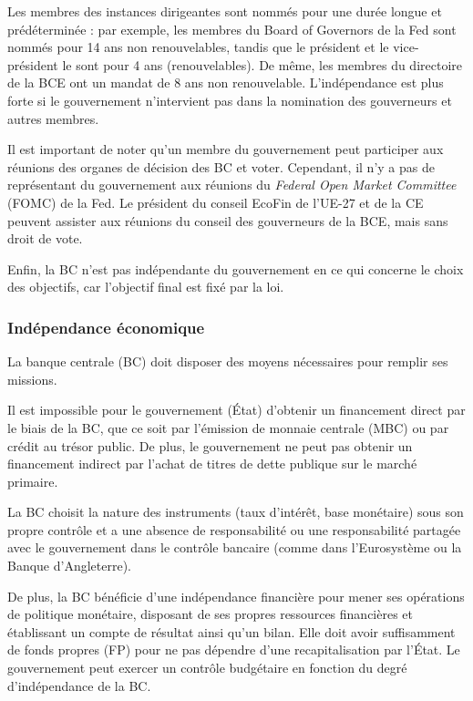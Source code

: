 \documentclass[a4paper, 12pt]{report}
\begin{document}
Les membres des instances dirigeantes sont nommés pour une durée longue et prédéterminée : par exemple, les membres du Board of Governors de la Fed sont nommés pour 14 ans non renouvelables, tandis que le président et le vice-président le sont pour 4 ans (renouvelables). De même, les membres du directoire de la BCE ont un mandat de 8 ans non renouvelable. L'indépendance est plus forte si le gouvernement n'intervient pas dans la nomination des gouverneurs et autres membres. 

Il est important de noter qu'un membre du gouvernement peut participer aux réunions des organes de décision des BC et voter. Cependant, il n'y a pas de représentant du gouvernement aux réunions du \textit{Federal Open Market Committee} (FOMC) de la Fed. Le président du conseil EcoFin de l'UE-27 et de la CE peuvent assister aux réunions du conseil des gouverneurs de la BCE, mais sans droit de vote. 

Enfin, la BC n'est pas indépendante du gouvernement en ce qui concerne le choix des objectifs, car l'objectif final est fixé par la loi.

\subsubsection{Indépendance économique}

La banque centrale (BC) doit disposer des moyens nécessaires pour remplir ses missions. 

Il est impossible pour le gouvernement (État) d'obtenir un financement direct par le biais de la BC, que ce soit par l'émission de monnaie centrale (MBC) ou par crédit au trésor public. De plus, le gouvernement ne peut pas obtenir un financement indirect par l'achat de titres de dette publique sur le marché primaire. 

La BC choisit la nature des instruments (taux d'intérêt, base monétaire) sous son propre contrôle et a une absence de responsabilité ou une responsabilité partagée avec le gouvernement dans le contrôle bancaire (comme dans l'Eurosystème ou la Banque d'Angleterre). 

De plus, la BC bénéficie d'une indépendance financière pour mener ses opérations de politique monétaire, disposant de ses propres ressources financières et établissant un compte de résultat ainsi qu'un bilan. Elle doit avoir suffisamment de fonds propres (FP) pour ne pas dépendre d'une recapitalisation par l'État. Le gouvernement peut exercer un contrôle budgétaire en fonction du degré d'indépendance de la BC.
\end{document}
